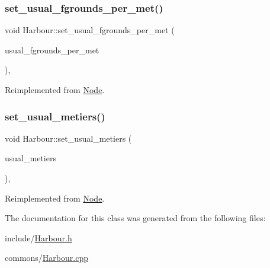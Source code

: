 \subsubsection{\texorpdfstring{set\_usual\_fgrounds\_per\_met()}{set\_usual\_fgrounds\_per\_met()}}
{\footnotesize\ttfamily void Harbour\+::set\+\_\+usual\+\_\+fgrounds\+\_\+per\+\_\+met (\begin{DoxyParamCaption}\item[{multimap$<$ int, \mbox{\hyperlink{classtypes_1_1_node_id}{types\+::\+Node\+Id}} $>$}]{usual\+\_\+fgrounds\+\_\+per\+\_\+met }\end{DoxyParamCaption})\hspace{0.3cm}{\ttfamily [override]}, {\ttfamily [virtual]}}



Reimplemented from \mbox{\hyperlink{class_node_ac9a4b300de4e64d3f4188ce543e80fbe}{Node}}.

\mbox{\label{class_harbour_ab7446ddd7d8aa93a0655ce899232fa66}} 
\subsubsection{\texorpdfstring{set\_usual\_metiers()}{set\_usual\_metiers()}}
{\footnotesize\ttfamily void Harbour\+::set\+\_\+usual\+\_\+metiers (\begin{DoxyParamCaption}\item[{multimap$<$ \mbox{\hyperlink{classtypes_1_1_node_id}{types\+::\+Node\+Id}}, int $>$}]{usual\+\_\+metiers }\end{DoxyParamCaption})\hspace{0.3cm}{\ttfamily [override]}, {\ttfamily [virtual]}}



Reimplemented from \mbox{\hyperlink{class_node_ad2630b68ea7d53b00c47a5ea1d6e4662}{Node}}.



The documentation for this class was generated from the following files\+:\begin{DoxyCompactItemize}
\item 
include/\mbox{\hyperlink{_harbour_8h}{Harbour.\+h}}\item 
commons/\mbox{\hyperlink{_harbour_8cpp}{Harbour.\+cpp}}\end{DoxyCompactItemize}
